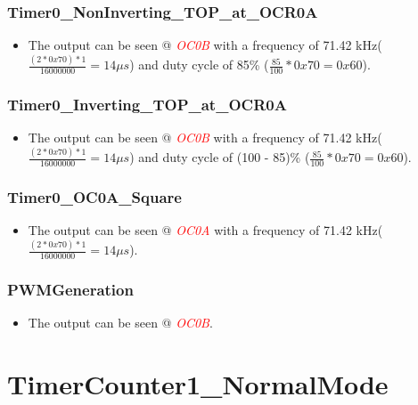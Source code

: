 \documentclass[oneside]{book}
\newcommand{\pinFormat}[1]{\emph{\textcolor{red}{#1}}}
\begin{document}
\subsubsection{Timer0\_NonInverting\_TOP\_at\_OCR0A}
\begin{itemize}
    \item The output can be seen @ \pinFormat{OC0B} with a frequency of 71.42 kHz($\frac{(2*0x70) * 1}{16000000} = 14\mu s$) and duty cycle of 85\% ($\frac{85}{100} * 0x70 = 0x60$).
\end{itemize}
\subsubsection{Timer0\_Inverting\_TOP\_at\_OCR0A}
\begin{itemize}
    \item The output can be seen @ \pinFormat{OC0B} with a frequency of 71.42 kHz($\frac{(2*0x70) * 1}{16000000} = 14\mu s$) and duty cycle of (100 - 85)\% ($\frac{85}{100} * 0x70 = 0x60$).
\end{itemize}
\subsubsection{Timer0\_OC0A\_Square}
\begin{itemize}
    \item The output can be seen @ \pinFormat{OC0A} with a frequency of 71.42 kHz($\frac{(2*0x70) * 1}{16000000} = 14\mu s$).
\end{itemize}
\subsubsection{PWMGeneration}
\begin{itemize}
    \item The output can be seen @ \pinFormat{OC0B}.
\end{itemize}





\section{TimerCounter1\_NormalMode}
\end{document}
